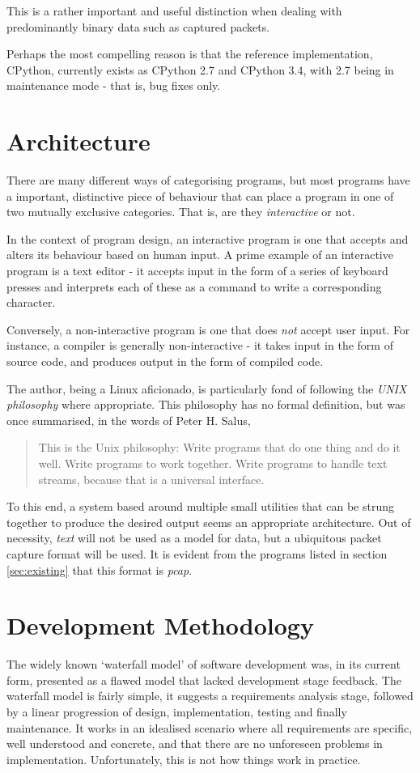 \documentclass[10pt,a4paper,notitlepage]{report}
\begin{document}
This is a rather important and useful distinction when dealing with predominantly binary data such as captured packets.

Perhaps the most compelling reason is that the reference implementation, CPython, currently exists as CPython 2.7 and CPython 3.4, with 2.7 being in maintenance mode\cite{cpy2maint} - that is, bug fixes only.

\section{Architecture}
There are many different ways of categorising programs, but most programs have a important, distinctive piece of behaviour that can place a program in one of two mutually exclusive categories. That is, are they \emph{interactive} or not.

In the context of program design, an interactive program is one that accepts and alters its behaviour based on human input.
A prime example of an interactive program is a text editor - it accepts input in the form of a series of keyboard presses and interprets each of these as a command to write a corresponding character.

Conversely, a non-interactive program is one that does \emph{not} accept user input. For instance, a compiler is generally non-interactive - it takes input in the form of source code, and produces output in the form of compiled code.

The author, being a Linux aficionado, is particularly fond of following the \emph{UNIX philosophy} where appropriate. This philosophy has no formal definition, but was once summarised, in the words of Peter H. Salus\cite{qcou},
\begin{quote}
This is the Unix philosophy: Write programs that do one thing and do it well. Write programs to work together. Write programs to handle text streams, because that is a universal interface.
\end{quote}

To this end, a system based around multiple small utilities that can be strung together to produce the desired output seems an appropriate architecture. Out of necessity, \emph{text} will not be used as a model for data, but a ubiquitous packet capture format will be used. It is evident from the programs listed in section \ref{sec:existing} that this format is \emph{pcap}.

\section{Development Methodology}
The widely known `waterfall model' of software development was, in its current form, presented as a flawed model that lacked development stage feedback\cite{wwr-waterfall-notes}. The waterfall model is fairly simple, it suggests a requirements analysis stage, followed by a linear progression of design, implementation, testing and finally maintenance. It works in an idealised scenario where all requirements are specific, well understood and concrete, and that there are no unforeseen problems in implementation. Unfortunately, this is not how things work in practice.
\end{document}
